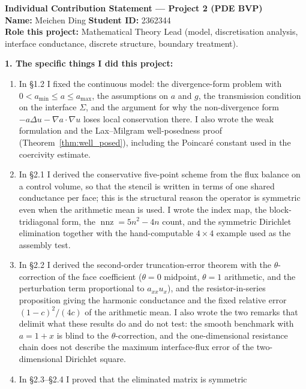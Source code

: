 \clearpage
\begin{formbox}
\small
\textbf{Individual Contribution Statement --- Project 2 (PDE BVP)}\\[0.3em]
\textbf{Name:} Meichen Ding \hfill \textbf{Student ID:} 2362344\\
\textbf{Role this project:} Mathematical Theory Lead (model, discretisation
analysis, interface conductance, discrete structure, boundary treatment).

\textbf{1. The specific things I did this project:}
\begin{enumerate}[leftmargin=1.5em,itemsep=1pt,topsep=2pt]
    \item In \S1.2 I fixed the continuous model: the divergence-form problem
    with $0<a_{\min}\le a\le a_{\max}$, the assumptions on $a$ and $g$, the
    transmission condition on the interface $\Sigma$, and the argument for why
    the non-divergence form $-a\Delta u-\nabla a\cdot\nabla u$ loses local
    conservation there. I also wrote the weak formulation and the Lax--Milgram
    well-posedness proof (Theorem~\ref{thm:well_posed}), including the
    Poincar\'e constant used in the coercivity estimate.
    \item In \S2.1 I derived the conservative five-point scheme from the flux
    balance on a control volume, so that the stencil is written in terms of one
    shared conductance per face; this is the structural reason the operator is
    symmetric even when the arithmetic mean is used. I wrote the index map, the
    block-tridiagonal form, the $\operatorname{nnz}=5n^2-4n$ count, and the
    symmetric Dirichlet elimination together with the hand-computable
    $4\times4$ example used as the assembly test.
    \item In \S2.2 I derived the second-order truncation-error theorem with the
    $\theta$-correction of the face coefficient
    ($\theta=0$ midpoint, $\theta=1$ arithmetic, and the perturbation term
    proportional to $a_{xx}u_x$), and the resistor-in-series proposition giving
    the harmonic conductance and the fixed relative error
    $(1-c)^2/(4c)$ of the arithmetic mean. I also wrote the two remarks that
    delimit what these results do and do not test: the smooth benchmark with
    $a=1+x$ is blind to the $\theta$-correction, and the one-dimensional
    resistance chain does not describe the maximum interface-flux error of the
    two-dimensional Dirichlet square.
    \item In \S2.3--\S2.4 I proved that the eliminated matrix is symmetric

\end{enumerate}
\end{formbox}
